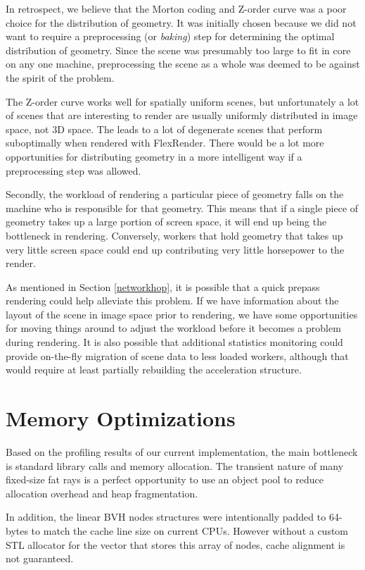 \documentclass[12pt]{ucthesis}
\begin{document}
In retrospect, we believe that the Morton coding and Z-order curve was
a poor choice for the distribution of geometry. It was initially chosen because
we did not want to require a preprocessing (or \emph{baking}) step for
determining the optimal distribution of geometry. Since the scene was presumably
too large to fit in core on any one machine, preprocessing the scene as a whole
was deemed to be against the spirit of the problem.

The Z-order curve works well for spatially uniform scenes, but unfortunately a
lot of scenes that are interesting to render are usually uniformly distributed
in image space, not 3D space. The leads to a lot of degenerate scenes that
perform suboptimally when rendered with FlexRender. There would be a lot more
opportunities for distributing geometry in a more intelligent way if a
preprocessing step was allowed.

Secondly, the workload of rendering a particular piece of geometry falls on
the machine who is responsible for that geometry. This means that if a single
piece of geometry takes up a large portion of screen space, it will end up
being the bottleneck in rendering. Conversely, workers that hold geometry that
takes up very little screen space could end up contributing very little
horsepower to the render.

As mentioned in Section \ref{networkhop}, it is possible that a quick prepass
rendering could help alleviate this problem. If we have information about the
layout of the scene in image space prior to rendering, we have some opportunities
for moving things around to adjust the workload before it becomes a problem during
rendering. It is also possible that additional statistics monitoring could provide
on-the-fly migration of scene data to less loaded workers, although that would
require at least partially rebuilding the acceleration structure.

\section{Memory Optimizations}
\label{memory}

Based on the profiling results of our current implementation, the main
bottleneck is standard library calls and memory allocation. The transient
nature of many fixed-size fat rays is a perfect opportunity to use an object
pool to reduce allocation overhead and heap fragmentation.

In addition, the linear BVH nodes structures were intentionally padded to
64-bytes to match the cache line size on current CPUs. However without a custom
STL allocator for the vector that stores this array of nodes, cache alignment
is not guaranteed.
\end{document}
